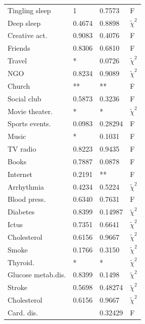 \documentclass[11pt]{article}
\theoremstyle{definition}
\theoremstyle{remark}
\begin{document}
\begin{table}[!htb]
\begin{tabular}{ |p{3cm}||p{3cm}|p{3cm}|p{.7cm}|  }
 Tingling sleep & 1 & 0.7573 & F \\
 Deep sleep & 0.4674& 0.8898 & $\tilde{\chi}^2$\\
 Creative act. & 0.9083 & 0.4076 & F\\
 Friends & 0.8306 & 0.6810 & F\\
 Travel & * & 0.0726 & $\tilde{\chi}^2$\\
 NGO  & 0.8234 & 0.9089 & $\tilde{\chi}^2$\\
 Church  & ** & ** & F\\
 Social club & 0.5873 & 0.3236 & F\\
 Movie theater.& * & * & $\tilde{\chi}^2$\\
 Sports events. & 0.0983 & 0.28294 & F\\
 Music & * & 0.1031 & F\\
 TV radio & 0.8223 & 0.9435 & F\\ 
 Books & 0.7887 & 0.0878 & F\\ 
 Internet & 0.2191 & ** & F\\ 
 Arrhythmia & 0.4234 & 0.5224 & $\tilde{\chi}^2$\\
 Blood press.& 0.6340 & 0.7631 & F \\
 Diabetes & 0.8399 &  0.14987 & $\tilde{\chi}^2$\\
 Ictus & 0.7351 & 0.6641 & $\tilde{\chi}^2$\\
 Cholesterol & 0.6156 & 0.9667 & $\tilde{\chi}^2$\\ %
 Smoke & 0.1766  & 0.3150 & $\tilde{\chi}^2$\\
 Thyroid. & * & * & $\tilde{\chi}^2$\\
 Glucose metab.dis.&0.8399 & 0.1498 & $\tilde{\chi}^2$\\ 
 Stroke &0.5698 & 0.48274 & $\tilde{\chi}^2$\\  %
 Cholesterol & 0.6156 & 0.9667 & $\tilde{\chi}^2$\\
 Card. dis. & &0.32429&F\\
 \hline
\end{tabular}
\label{tab:fischiall}
\end{table}
\end{document}
